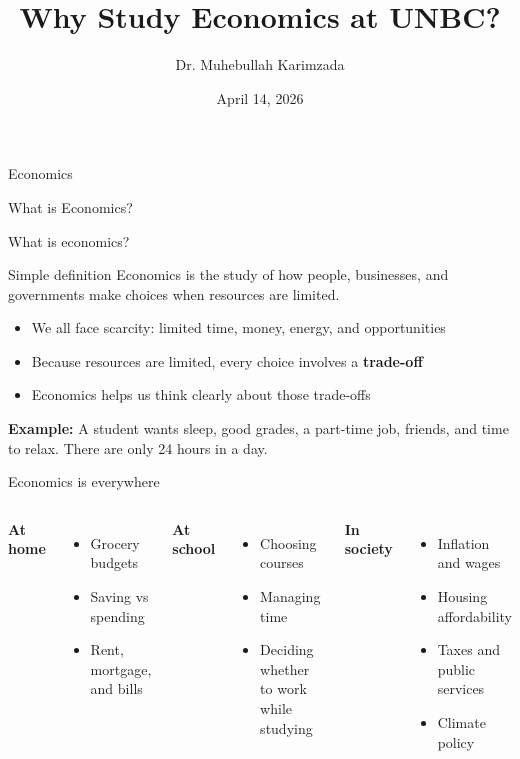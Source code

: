 \documentclass[aspectratio=169,11pt]{beamer}
\title{Why Study Economics at UNBC?\vspace{.3cm}}
\author{Dr.  Muhebullah Karimzada}
\date{April 14, 2026}
\begin{document}
\begin{frame}
    \titlepage
\end{frame}


\begin{frame}{Economics}
\begin{center}
{\LARGE What is Economics?}
\end{center}
\end{frame}

\begin{frame}{What is economics?}
\begin{block}{Simple definition}
Economics is the study of how people, businesses, and governments make choices when resources are limited.
\end{block}
\vspace{0.2cm}
\begin{itemize}
    \item We all face scarcity: limited time, money, energy, and opportunities
    \item Because resources are limited, every choice involves a \textbf{trade-off}
    \item Economics helps us think clearly about those trade-offs
\end{itemize}
\vspace{0.3cm}
\textbf{Example:} A student wants sleep, good grades, a part-time job, friends, and time to relax.\newline
There are only 24 hours in a day. 
\end{frame}

\begin{frame}{Economics is everywhere}
\begin{columns}[T,totalwidth=\textwidth]
\textbf{At home}
\begin{itemize}
    \item Grocery budgets
    \item Saving vs spending
    \item Rent, mortgage, and bills
\end{itemize}
\vspace{0.2cm}
\textbf{At school}
\begin{itemize}
    \item Choosing courses
    \item Managing time
    \item Deciding whether to work while studying
\end{itemize}

\textbf{In society}
\begin{itemize}
    \item Inflation and wages
    \item Housing affordability
    \item Taxes and public services
    \item Climate policy
\end{itemize}
\end{columns}
\vspace{0.4cm}
\end{frame}
\end{document}

